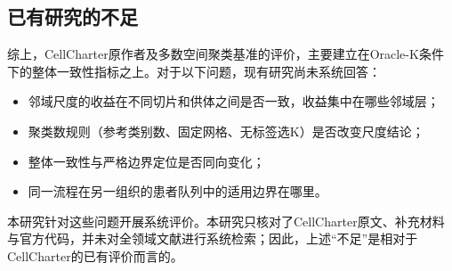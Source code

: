 \subsection{已有研究的不足}
\label{subsec:cc-gap-p1}
综上，CellCharter原作者及多数空间聚类基准的评价，主要建立在Oracle-K条件下的整体一致性指标之上。对于以下问题，现有研究尚未系统回答：
\begin{itemize}
  \item 邻域尺度的收益在不同切片和供体之间是否一致，收益集中在哪些邻域层；
  \item 聚类数规则（参考类别数、固定网格、无标签选K）是否改变尺度结论；
  \item 整体一致性与严格边界定位是否同向变化；
  \item 同一流程在另一组织的患者队列中的适用边界在哪里。
\end{itemize}
本研究针对这些问题开展系统评价。本研究只核对了CellCharter原文、补充材料与官方代码，并未对全领域文献进行系统检索；因此，上述“不足”是相对于CellCharter的已有评价而言的。
